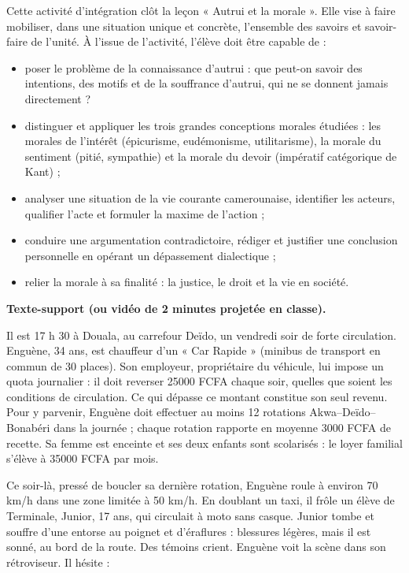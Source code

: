 \documentclass[11pt]{article}
\newcommand{\cle}[1]{{\popxbold\color{popdark}#1}}
\newcounter{popsec}
\newcounter{popsub}
\newcommand{\courssub}[1]{%
  \stepcounter{popsub}%
  \par\vspace{9pt}\noindent{\popxbold\fontsize{11.5}{13}\selectfont\color{popink}{\color{poporange}\thepopsec.\thepopsub}\hspace{6pt}#1}\par\nopagebreak\vspace{4pt}
}
\begin{document}
Cette activité d'intégration clôt la leçon « Autrui et la morale ». Elle vise à faire mobiliser, dans une situation unique et concrète, l'ensemble des savoirs et savoir-faire de l'unité. À l'issue de l'activité, l'élève doit être capable de :

\begin{itemize}
\item poser le \cle{problème de la connaissance d'autrui} : que peut-on savoir des intentions, des motifs et de la souffrance d'autrui, qui ne se donnent jamais directement ?
\item distinguer et appliquer les trois grandes \cle{conceptions morales} étudiées : les morales de l'\cle{intérêt} (épicurisme, eudémonisme, utilitarisme), la morale du \cle{sentiment} (pitié, sympathie) et la morale du \cle{devoir} (impératif catégorique de Kant) ;
\item analyser une situation de la vie courante camerounaise, identifier les acteurs, qualifier l'acte et formuler la \cle{maxime} de l'action ;
\item conduire une argumentation contradictoire, rédiger et justifier une conclusion personnelle en opérant un dépassement dialectique ;
\item relier la morale à sa finalité : la \cle{justice}, le \cle{droit} et la vie en société.
\end{itemize}

\courssub{Situation}

\textbf{Texte-support (ou vidéo de 2 minutes projetée en classe).}

Il est 17 h 30 à Douala, au carrefour Deïdo, un vendredi soir de forte circulation. Enguène, 34 ans, est chauffeur d'un « Car Rapide » (minibus de transport en commun de 30 places). Son employeur, propriétaire du véhicule, lui impose un \cle{quota} journalier : il doit reverser \num{25000} FCFA chaque soir, quelles que soient les conditions de circulation. Ce qui dépasse ce montant constitue son seul revenu. Pour y parvenir, Enguène doit effectuer au moins 12 rotations Akwa--Deïdo--Bonabéri dans la journée ; chaque rotation rapporte en moyenne \num{3000} FCFA de recette. Sa femme est enceinte et ses deux enfants sont scolarisés : le loyer familial s'élève à \num{35000} FCFA par mois.

Ce soir-là, pressé de boucler sa dernière rotation, Enguène roule à environ 70 km/h dans une zone limitée à 50 km/h. En doublant un taxi, il frôle un élève de Terminale, Junior, 17 ans, qui circulait à moto sans casque. Junior tombe et souffre d'une entorse au poignet et d'éraflures : blessures légères, mais il est sonné, au bord de la route. Des témoins crient. Enguène voit la scène dans son rétroviseur. Il hésite :
\end{document}
